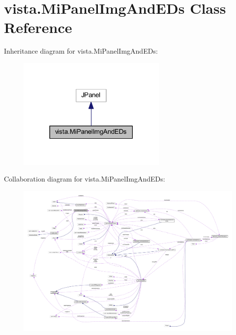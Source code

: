 \hypertarget{classvista_1_1_mi_panel_img_and_e_ds}{}\section{vista.\+Mi\+Panel\+Img\+And\+E\+Ds Class Reference}
\label{classvista_1_1_mi_panel_img_and_e_ds}


Inheritance diagram for vista.\+Mi\+Panel\+Img\+And\+E\+Ds\+:
\nopagebreak
\begin{figure}[H]
\begin{center}
\leavevmode
\includegraphics[width=206pt]{classvista_1_1_mi_panel_img_and_e_ds__inherit__graph}
\end{center}
\end{figure}


Collaboration diagram for vista.\+Mi\+Panel\+Img\+And\+E\+Ds\+:
\nopagebreak
\begin{figure}[H]
\begin{center}
\leavevmode
\includegraphics[width=350pt]{classvista_1_1_mi_panel_img_and_e_ds__coll__graph}
\end{center}
\end{figure}
